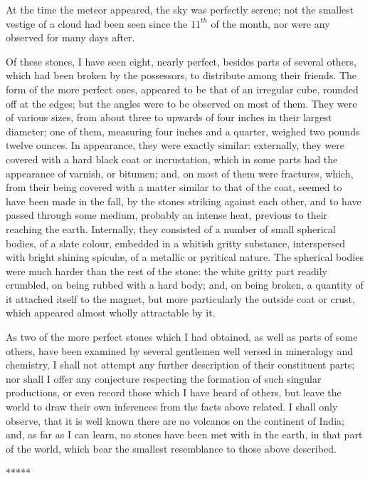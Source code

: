 \documentclass[a4paper, 12pt, oneside, twocolumn]{article}
\begin{document}
At the time the meteor appeared, the sky was perfectly serene; not the smallest vestige of a cloud had been seen since the $11^{th}$ of the month, nor were any observed for many days after.

Of these stones, I have seen eight, nearly perfect, besides parts of several others, which had been broken by the possessors, to distribute among their friends. The form of the more perfect ones, appeared to be that of an irregular cube, rounded off at the edges; but the angles were to be observed on most of them. They were of various sizes, from about three to upwards of four inches in their largest diameter; one of them, measuring four inches and a quarter, weighed two pounds twelve ounces. In appearance, they were exactly similar: externally, they were covered with a hard black coat or incrustation, which in some parts had the appearance of varnish, or bitumen; and, on most of them were fractures, which, from their being covered with a matter similar to that of the coat, seemed to have been made in the fall, by the stones striking against each other, and to have passed through some medium, probably an intense heat, previous to their reaching the earth. Internally, they consisted of a number of small spherical bodies, of a slate colour, embedded in a whitish gritty substance, interspersed with bright shining spiculæ, of a metallic or pyritical nature. The spherical bodies were much harder than the rest of the stone: the white gritty part readily crumbled, on being rubbed with a hard body; and, on being broken, a quantity of it attached itself to the magnet, but more particularly the outside coat or crust, which appeared almost wholly attractable by it.

As two of the more perfect stones which I had obtained, as well as parts of some others, have been examined by several gentlemen well versed in mineralogy and chemistry, I shall not attempt any further description of their constituent parts; nor shall I offer any conjecture respecting the formation of such singular productions, or even record those which I have heard of others, but leave the world to draw their own inferences from the facts above related. I shall only observe, that it is well known there are no volcanos on the continent of India; and, as far as I can learn, no stones have been met with in the earth, in that part of the world, which bear the smallest resemblance to those above described.

\centerline{*\hspace{15mm}*\hspace{15mm}*\hspace{15mm}*\hspace{15mm}*}
\bigskip
\end{document}
